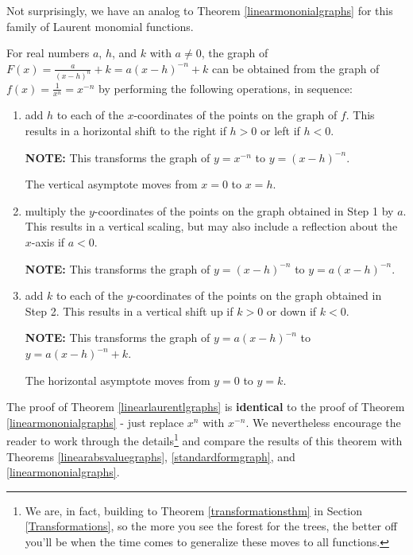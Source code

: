 \documentclass{ximera}
\begin{document}
Not surprisingly, we have an analog to Theorem \ref{linearmononialgraphs} for this family of Laurent monomial functions.

\colorbox{ResultColor}{\bbm

\begin{thm} \label{linearlaurentlgraphs}  For real numbers $a$, $h$, and $k$ with $a \neq 0$, the graph of $F(x) = \frac{a}{(x-h)^n}+k =  a(x-h)^{-n}+k$  can be obtained from the graph of $f(x) = \frac{1}{x^n}= x^{-n}$ by performing the following operations, in sequence:

\begin{enumerate}

\item  add $h$ to each of the $x$-coordinates of the points on the graph of $f$.  This results in a horizontal shift to the right if $h > 0$ or left if $h < 0$.

\textbf{NOTE:}  This transforms the graph of $y = x^{-n}$ to $y = (x-h)^{-n}$.   

The vertical asymptote moves from $x=0$ to $x=h$.

\item  multiply the $y$-coordinates of the points on the graph obtained in Step 1 by $a$.   This results in a vertical scaling, but may also include a reflection about the $x$-axis if $a < 0$.

\textbf{NOTE:}  This transforms the graph of $y = (x-h)^{-n}$ to $y = a(x-h)^{-n}$.

\item  add $k$ to each of the $y$-coordinates of the points on the graph obtained in Step 2.  This results in a vertical shift up if $k > 0$ or down if $k< 0$.

\textbf{NOTE:}  This transforms the graph of  $y = a(x-h)^{-n}$ to $y = a(x-h)^{-n}+k$.

The  horizontal asymptote moves from $y=0$ to $y=k$.

\end{enumerate}

\end{thm}

\ebm}


The proof of Theorem \ref{linearlaurentlgraphs} is \textbf{identical} to the proof of Theorem \ref{linearmononialgraphs} - just replace $x^n$ with $x^{-n}$.  We nevertheless encourage the reader to work through the details\footnote{We are, in fact, building to Theorem \ref{transformationsthm} in Section \ref{Transformations}, so the more you see the forest for the trees, the better off you'll be when the time comes to generalize these moves to all functions.} and compare the results of this theorem with Theorems \ref{linearabsvaluegraphs}, \ref{standardformgraph}, and  \ref{linearmononialgraphs}.
\end{document}
